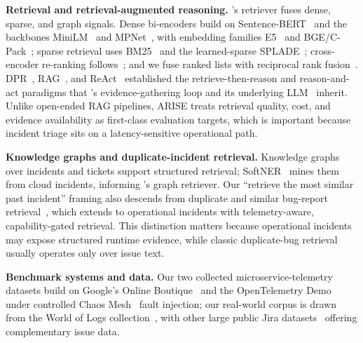 \noindent\textbf{Retrieval and retrieval-augmented reasoning.} \sys{}'s retriever
fuses dense, sparse, and graph signals. Dense bi-encoders build on
Sentence-BERT~\cite{reimers2019sbert} and the backbones
MiniLM~\cite{wang2020minilm} and MPNet~\cite{song2020mpnet}, with embedding
families E5~\cite{wang2022e5} and BGE/C-Pack~\cite{xiao2024cpack}; sparse retrieval
uses BM25~\cite{robertson2009bm25} and the learned-sparse
SPLADE~\cite{formal2021splade}; cross-encoder re-ranking
follows~\cite{nogueira2019passage}; and we fuse ranked lists with reciprocal rank
fusion~\cite{cormack2009rrf}. DPR~\cite{karpukhin2020dpr}, RAG~\cite{lewis2020rag},
and ReAct~\cite{yao2023react} established the retrieve-then-reason and
reason-and-act paradigms that \sys{}'s evidence-gathering loop and its underlying
LLM~\cite{qwen2024} inherit. Unlike open-ended RAG pipelines, ARISE treats retrieval quality, cost, and evidence availability as first-class evaluation targets, which is important because incident triage sits on a latency-sensitive operational path.

\noindent\textbf{Knowledge graphs and duplicate-incident retrieval.} Knowledge
graphs over incidents and tickets support structured retrieval;
SoftNER~\cite{shetty2022softner} mines them from cloud incidents, informing
\sys{}'s graph retriever. Our ``retrieve the most similar past incident'' framing
also descends from duplicate and similar bug-report
retrieval~\cite{runeson2007duplicate,sun2010duplicate,he2020dccnn}, which \sys{}
extends to operational incidents with telemetry-aware, capability-gated retrieval. This distinction matters because operational incidents may expose structured runtime evidence, while classic duplicate-bug retrieval usually operates only over issue text.

\noindent\textbf{Benchmark systems and data.} Our two collected
microservice-telemetry datasets build on Google's Online
Boutique~\cite{googleboutique} and the OpenTelemetry Demo~\cite{oteldemo} under
controlled Chaos Mesh~\cite{chaosmesh} fault injection; our real-world corpus is
drawn from the World of Logs collection~\cite{wang2026worldoflogs}, with other
large public Jira datasets~\cite{montgomery2022jira} offering complementary issue
data.
